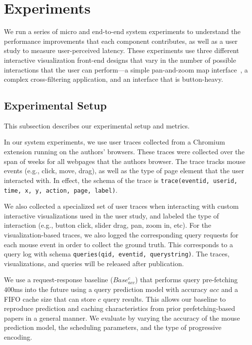 

\section{Experiments}
\label{sec:experiments}

We run a series of micro and end-to-end system experiments to understand the performance improvements that each component contributes, as well as a user study to measure user-perceived latency.  These experiments use three different interactive visualization front-end designs that vary in the number of possible interactions that the user can perform---a simple pan-and-zoom map interface~\cite{}, a complex cross-filtering application, and an interface that is button-heavy.



\subsection{Experimental Setup}
This subsection describes our experimental setup and metrics.

In our system experiments, we use  user traces collected from a Chromium extension running on the authors' browsers.  These traces were collected over the span of  weeks for all webpages that the authors browser.  The trace tracks mouse events (e.g., click, move, drag), as well as the type of page element that the user interacted with.  In effect, the schema of the trace is \texttt{trace(eventid, userid, time, x, y, action, page, label)}. 

We also collected a specialized set of user traces when interacting with custom interactive visualizations used in the user study, and labeled the type of interaction (e.g., button click, slider drag, pan, zoom in, etc).  For the visualization-based traces, we also logged the corresponding query requests for each mouse event in order to collect the ground truth.  This corresponds to a query log with schema \texttt{queries(qid, eventid, querystring)}.  The traces, visualizations, and queries will be released after publication.

We use a request-response baseline ($Base_{acc}^{c}$) that performs query pre-fetching $400$ms into the future using a query prediction model with accuracy $acc$ and a FIFO cache size that can store $c$ query results.   This allows our baseline to reproduce prediction and caching characteristics from prior prefetching-based papers in a general manner.  We evaluate \sys by varying the accuracy of the mouse prediction model, the scheduling parameters, and the type of progressive encoding.  

